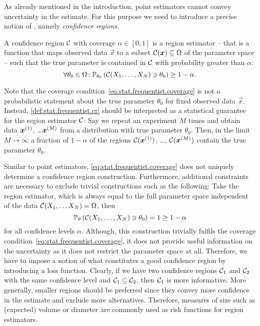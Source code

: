 As already mentioned in the introduction, point estimators cannot convey uncertainty in the estimate.
For this purpose we need to introduce a precise notion of , namely \emph{confidence regions}.
\begin{definition}\label{def:stat.frequentist.cr}
  A confidence region $\mathcal{C}$ with coverage $\alpha \in [0,1]$ is a region estimator -- that is a function that maps observed data $\vec x$ to a subset $\mathcal{C}({\boldsymbol{x}}) \subseteq \Omega$ of the parameter space -- such that the true parameter is contained in $\mathcal{C}$ with probability greater than $\alpha$:
  \[
    \label{eq:stat.frequentist.coverage}
    \forall \theta_0\in\Omega \colon \mathbb{P}_{\theta_0}\left( \mathcal{C}(X_1, \ldots, X_N) \ni \theta_0 \right) \ge 1 - \alpha.
  \]
\end{definition}
Note that the coverage condition~\eqref{eq:stat.frequentist.coverage} is not a probabilistic statement about the true parameter $\theta_0$ for fixed observed data $\vec x$.
Instead, \cref{def:stat.frequentist.cr} should be interpreted as a statistical guarantee for the region estimator $\mathcal{C}$:
Say we repeat an experiment $M$ times and obtain data ${\boldsymbol{x}}^{(1)}$, \ldots ${\boldsymbol{x}}^{(M)}$ from a distribution with true parameter $\theta_0$.
Then, in the limit $M \to \infty$ a fraction of $1 - \alpha$ of the regions $\mathcal{C}({\boldsymbol{x}}^{(1)})$, \ldots, $\mathcal{C}({\boldsymbol{x}}^{(M)})$ contain the true parameter $\theta_0$.

Similar to point estimators, \cref{eq:stat.frequentist.coverage} does not uniquely determine a confidence region construction.
Furthermore, additional constraints are necessary to exclude trivial constructions such as the following:
Take the region estimator, which is always equal to the full parameter space independent of the data $\mathcal{C}(X_1, \ldots X_N) = \Omega$, then
\[
  \mathbb{P}_\theta\left(  \mathcal{C}(X_1, \ldots, X_N) \ni \theta_0  \right) = 1 \ge 1 - \alpha
\]
for all confidence levels $\alpha$.
Although, this construction trivially fulfils the coverage condition~\eqref{eq:stat.frequentist.coverage}, it does not provide useful information on the uncertainty as it does not restrict the parameter space at all.
Therefore, we have to impose a notion of what constitutes a good confidence region by introducing a loss function.
Clearly, if we have two confidence regions $\mathcal{C}_1$ and $\mathcal{C}_2$ with the same confidence level and $\mathcal{C}_1 \subseteq \mathcal{C}_2$, then $\mathcal{C}_1$ is more informative.
More generally, smaller regions should be preferred since they convey more confidence in the estimate and exclude more alternatives.
Therefore, measures of size such as (expected) volume or diameter are commonly used as risk functions for region estimators.

